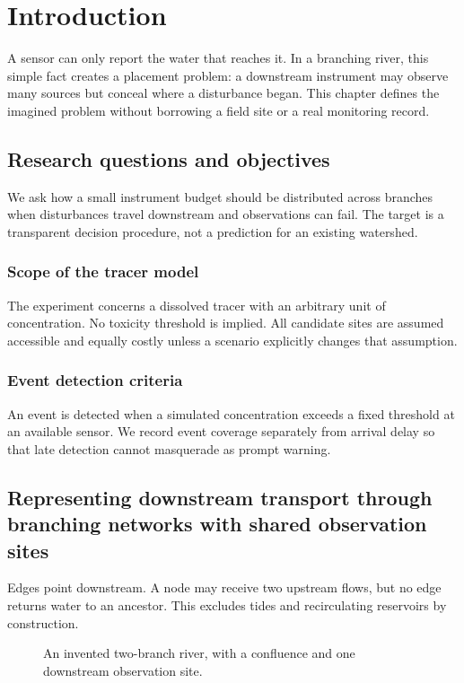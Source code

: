 \chapter{Introduction}\label{demo-framing}
A sensor can only report the water that reaches it. In a branching river, this simple fact creates a placement problem: a downstream instrument may observe many sources but conceal where a disturbance began. This chapter defines the imagined problem without borrowing a field site or a real monitoring record.
\section{Research questions and objectives}\label{demo-framing-question}
We ask how a small instrument budget should be distributed across branches when disturbances travel downstream and observations can fail. The target is a transparent decision procedure, not a prediction for an existing watershed.
\subsection{Scope of the tracer model}\label{demo-framing-scope}
The experiment concerns a dissolved tracer with an arbitrary unit of concentration. No toxicity threshold is implied. All candidate sites are assumed accessible and equally costly unless a scenario explicitly changes that assumption.
\subsection{Event detection criteria}\label{demo-framing-evidence}
An event is detected when a simulated concentration exceeds a fixed threshold at an available sensor. We record event coverage separately from arrival delay so that late detection cannot masquerade as prompt warning.
\section{Representing downstream transport through branching networks with shared observation sites}\label{demo-framing-network}
Edges point downstream. A node may receive two upstream flows, but no edge returns water to an ancestor. This excludes tides and recirculating reservoirs by construction.
\begin{figure}[htbp]
\centering
{}
\caption{An invented two-branch river, with a confluence and one downstream observation site.}\label{demo-fig-network}
\end{figure}
